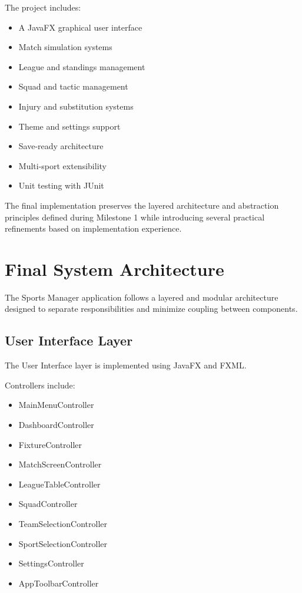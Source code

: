 \documentclass[11pt,a4paper]{article}
\begin{document}
The project includes:
\begin{itemize}
\item A JavaFX graphical user interface
\item Match simulation systems
\item League and standings management
\item Squad and tactic management
\item Injury and substitution systems
\item Theme and settings support
\item Save-ready architecture
\item Multi-sport extensibility
\item Unit testing with JUnit
\end{itemize}

The final implementation preserves the layered architecture and abstraction principles defined during Milestone 1 while introducing several practical refinements based on implementation experience.

\section{Final System Architecture}

The Sports Manager application follows a layered and modular architecture designed to separate responsibilities and minimize coupling between components.

\subsection{User Interface Layer}

The User Interface layer is implemented using JavaFX and FXML.

Controllers include:
\begin{itemize}
\item MainMenuController
\item DashboardController
\item FixtureController
\item MatchScreenController
\item LeagueTableController
\item SquadController
\item TeamSelectionController
\item SportSelectionController
\item SettingsController
\item AppToolbarController
\end{itemize}
\end{document}
